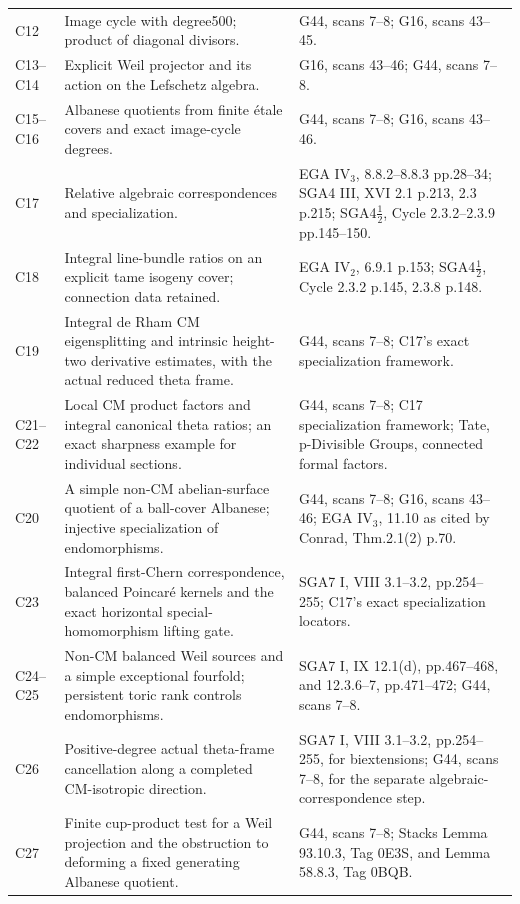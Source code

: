 \documentclass[11pt]{article}
\theoremstyle{definition}\newtheorem{definition}[theorem]{Definition}\newtheorem{remark}[theorem]{Remark}
\begin{document}
\begin{longtable}{@{}p{.18\linewidth}p{.48\linewidth}p{.27\linewidth}@{}}
C12 & Image cycle with degree500; product of diagonal divisors. & G44, scans 7--8; G16, scans 43--45.\\
C13--C14 & Explicit Weil projector and its action on the Lefschetz algebra. & G16, scans 43--46; G44, scans 7--8.\\
C15--C16 & Albanese quotients from finite \'etale covers and exact image-cycle degrees. & G44, scans 7--8; G16, scans 43--46.\\
C17 & Relative algebraic correspondences and specialization. & EGA IV$_3$, 8.8.2--8.8.3 pp.28--34; SGA4 III, XVI 2.1 p.213, 2.3 p.215; SGA4$\frac12$, Cycle 2.3.2--2.3.9 pp.145--150.\\
C18 & Integral line-bundle ratios on an explicit tame isogeny cover; connection data retained. & EGA IV$_2$, 6.9.1 p.153; SGA4$\frac12$, Cycle 2.3.2 p.145, 2.3.8 p.148.\\
C19 & Integral de Rham CM eigensplitting and intrinsic height-two derivative estimates, with the actual reduced theta frame. & G44, scans 7--8; C17's exact specialization framework.\\
C21--C22 & Local CM product factors and integral canonical theta ratios; an exact sharpness example for individual sections. & G44, scans 7--8; C17 specialization framework; Tate, p-Divisible Groups, connected formal factors.\\
C20 & A simple non-CM abelian-surface quotient of a ball-cover Albanese; injective specialization of endomorphisms. & G44, scans 7--8; G16, scans 43--46; EGA IV$_3$, 11.10 as cited by Conrad, Thm.2.1(2) p.70.\\
C23 & Integral first-Chern correspondence, balanced Poincar\'e kernels and the exact horizontal special-homomorphism lifting gate. & SGA7 I, VIII 3.1--3.2, pp.254--255; C17's exact specialization locators.\\
C24--C25 & Non-CM balanced Weil sources and a simple exceptional fourfold; persistent toric rank controls endomorphisms. & SGA7 I, IX 12.1(d), pp.467--468, and 12.3.6--7, pp.471--472; G44, scans 7--8.\\
C26 & Positive-degree actual theta-frame cancellation along a completed CM-isotropic direction. & SGA7 I, VIII 3.1--3.2, pp.254--255, for biextensions; G44, scans 7--8, for the separate algebraic-correspondence step.\\
C27 & Finite cup-product test for a Weil projection and the obstruction to deforming a fixed generating Albanese quotient. & G44, scans 7--8; Stacks Lemma 93.10.3, Tag 0E3S, and Lemma 58.8.3, Tag 0BQB.\\

\end{longtable}
\end{document}
